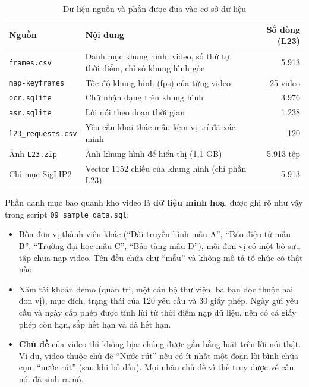 \begin{table}[H]
\centering
\caption{Dữ liệu nguồn và phần được đưa vào cơ sở dữ liệu}
\label{tab:source_data}
\renewcommand{\arraystretch}{1.2}
\small
\begin{tabularx}{\textwidth}{>{\raggedright\arraybackslash}p{4.0cm} >{\raggedright\arraybackslash}X r}
\toprule
\textbf{Nguồn} & \textbf{Nội dung} & \textbf{Số dòng (L23)} \\
\midrule
\texttt{frames.csv} & Danh mục khung hình: video, số thứ tự, thời điểm, chỉ số khung hình gốc & 5.913 \\
\texttt{map-keyframes} & Tốc độ khung hình (fps) của từng video & 25 video \\
\texttt{ocr.sqlite} & Chữ nhận dạng trên khung hình & 3.976 \\
\texttt{asr.sqlite} & Lời nói theo đoạn thời gian & 1.238 \\
\texttt{l23\_requests.csv} & Yêu cầu khai thác mẫu kèm vị trí đã xác minh & 120 \\
Ảnh \texttt{L23.zip} & Ảnh khung hình để hiển thị (1,1 GB) & 5.913 tệp \\
Chỉ mục SigLIP2 & Vector 1152 chiều của khung hình (chỉ phần L23) & 5.913 \\
\bottomrule
\end{tabularx}
\end{table}

Phần danh mục bao quanh kho video là \textbf{dữ liệu minh hoạ}, được ghi rõ như vậy trong
script \texttt{09\_sample\_data.sql}:
\begin{itemize}
    \item Bốn đơn vị thành viên khác (``Đài truyền hình mẫu A'', ``Báo điện tử mẫu B'',
    ``Trường đại học mẫu C'', ``Bảo tàng mẫu D''), mỗi đơn vị có một bộ sưu tập chưa nạp
    video. Tên đều chứa chữ ``mẫu'' và không mô tả tổ chức có thật nào.
    \item Năm tài khoản demo (quản trị, một cán bộ thư viện, ba bạn đọc thuộc hai đơn vị),
    mục đích, trạng thái của 120 yêu cầu và 30 giấy phép. Ngày gửi yêu cầu và ngày cấp phép
    được tính lùi từ thời điểm nạp dữ liệu, nên có cả giấy phép còn hạn, sắp hết hạn và đã
    hết hạn.
    \item \textbf{Chủ đề} của video thì không bịa: chúng được gắn bằng luật trên lời nói thật.
    Ví dụ, video thuộc chủ đề ``Nước rút'' nếu có ít nhất một đoạn lời bình chứa cụm ``nước
    rút'' (sau khi bỏ dấu). Mọi nhãn chủ đề vì thế truy được về câu nói đã sinh ra nó.
\end{itemize}

